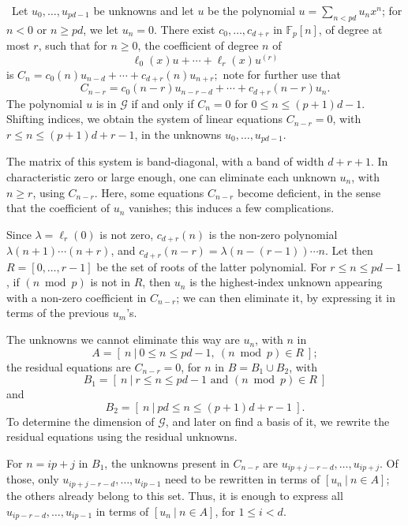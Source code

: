 \documentclass{sig-alternate}
\def\F {\mathbb{F}}
\def\myproof{\noindent{\sc Proof.}~}
\begin{document}
\smallskip \myproof Let $u_0,\dots,u_{pd-1}$ be unknowns and let
$u$ be the polynomial
$u=\sum_{n < pd} u_n x^n$; for $n<0$ or $n\ge pd$, we let
$u_n=0$. There exist $c_0,\dots,c_{d+r}$ in $\F_p[n]$, of degree at
most $r$, such that for $n \ge 0$, the coefficient of degree $n$ of
\begin{equation}
  \label{eq:u}
\ell_0(x) u + \cdots + \ell_r(x) u^{(r)}
\end{equation}
is 
$C_n= c_0(n) u_{n-d}+ \cdots + c_{d+r}(n) u_{n+r};$
note for further use that
\begin{equation}
  \label{eq:coef}
C_{n-r}= c_0(n-r) u_{n-r-d}+ \cdots + c_{d+r}(n-r) u_n.
\end{equation}
The polynomial $u$ is in $\mathcal{G}$ if and only if $C_n=0$ for $0
\le n \le (p+1)d-1$. Shifting indices, we obtain the system of linear
equations $C_{n-r}=0$, with $r \le n \le (p+1)d+r-1$, in the unknowns
$u_0,\dots,u_{pd-1}$.

The matrix of this system is band-diagonal, with a band of width
$d+r+1$. In characteristic zero or large enough, one can eliminate each
unknown $u_n$, with $n \ge r$, using $C_{n-r}$. Here, some equations
$C_{n-r}$ become deficient, in the sense that the coefficient of
$u_n$ vanishes; this induces a few complications.

\smallskip{}
Since $\lambda=\ell_r(0)$ is not zero, $c_{d+r}(n)$ is the non-zero
polynomial $\lambda(n+1)\cdots(n+r)$, and
$c_{d+r}(n-r)=\lambda(n-(r-1))\cdots n$.  Let then $R=[0,\dots,r-1]$
be the set of roots of the latter polynomial. For $r \le n \le pd-1$,
if $(n \bmod p)$ is not in $R$, then $u_n$ is the highest-index
unknown appearing with a non-zero coefficient in $C_{n-r}$; we can
then eliminate it, by expressing it in terms of the previous $u_m$'s.

The unknowns we cannot eliminate this way are $u_n$, with $n$ in 
$$A=[\ n \ |\ 0 \le n \le pd-1,\ (n \bmod p) \in R\ ];$$ 
the residual equations are $C_{n-r}=0$,
for $n$ in $B=B_1 \cup B_2$, with
$$B_1=[\ n \ | \ r \le n \le pd-1 \text{~and~} (n\bmod p) \in R\ ]$$
and 
$$B_2=[\ n \ | \ pd \le n \le (p+1)d+r-1\ ].$$
To determine the dimension of $\mathcal{G}$, and later on find a basis
of it, we rewrite the residual equations using the residual unknowns.

For $n=ip+j$ in $B_1$, the unknowns present in $C_{n-r}$ are
$u_{ip+j-r-d},\dots,u_{ip+j}$. Of those, only
$u_{ip+j-r-d},\dots,u_{ip-1}$ need to be rewritten in terms of $[u_n\
|\ n \in A]$; the others already belong to this set. Thus, it is
enough to express all $u_{ip-r-d},\dots,u_{ip-1}$ in terms of $[u_n\
|\ n \in A]$, for $1 \le i < d$.
\end{document}
